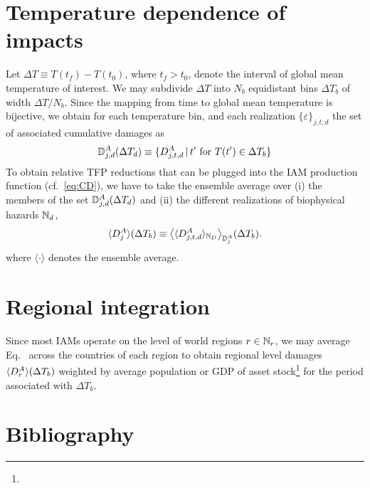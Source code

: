 \documentclass[preprint,3p,authoryear]{elsarticle}
\begin{document}
\section{Temperature dependence of impacts}
Let  $\Delta T\equiv T(t_f)-T(t_0)$, where $t_f>t_0$, denote the interval of global mean temperature of interest. We may subdivide $\Delta T$ into $N_b$ equidistant bins $\Delta T_b$ of width $\Delta T/N_b$. Since the mapping from time to global mean temperature is bijective, we obtain for each temperature bin, and each realization $\lbrace \varepsilon\rbrace_{j,t,d}$ the set of associated cumulative damages as
\begin{equation}
  \label{eq:DDA}
  \mathbb{D}^A_{j,d}(\Delta T_d)\equiv\lbrace D^A_{j,t,d}\, \vert\, t' \text{ for } T(t')\in\Delta T_b \rbrace
\end{equation}
To obtain relative TFP reductions that can be plugged into the IAM production function (cf.~\eqref{eq:CD}), we have to take the ensemble average over (i) the members of the set $\mathbb{D}^A_{j,d}(\Delta T_d)$ and (ii) the different realizations of biophysical hazards $\mathbb{N}_d$,
\begin{equation}
  \label{eq:2}
  \langle D^A_{j}\rangle(\Delta T_b)\equiv\big\langle\langle D^A_{j,t,d}\rangle_{\mathbb{N}_D}\big\rangle_{\mathbb{D}^A_{j}}(\Delta T_b).
\end{equation}
where $\langle\cdot\rangle$ denotes the ensemble average.

\section{Regional integration}
\label{sec:regInt}
Since most IAMs operate on the level of world regions $r\in\mathbb{N}_r$, we may average Eq.~ across the countries of each region to obtain regional level damages $\langle D^A_{r}\rangle(\Delta T_b)$ weighted by average population or GDP of asset stock\footnote{} for the period associated with $\Delta T_b$.



\section*{Bibliography}
%

\end{document}
